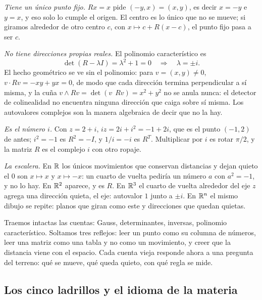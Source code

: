 \emph{Tiene un único punto fijo.} \(Rx=x\) pide \((-y,x)=(x,y)\), es decir \(x=-y\) e
\(y=x\), y eso solo lo cumple el origen. El centro es lo único que no se mueve; si giramos
alrededor de otro centro \(c\), con \(x\mapsto c+R(x-c)\), el punto fijo pasa a ser \(c\).

\emph{No tiene direcciones propias reales.} El polinomio característico es
\[
  \det(R-\lambda I)=\lambda^2+1=0\quad\Longrightarrow\quad\lambda=\pm i .
\]
El hecho geométrico se ve sin el polinomio: para \(v=(x,y)\neq0\), \(v\cdot Rv=-xy+yx=0\),
de modo que cada dirección termina perpendicular a sí misma, y la cuña
\(v\wedge Rv=\det(v\ \ Rv)=x^2+y^2\) no se anula nunca: el detector de colinealidad no
encuentra ninguna dirección que caiga sobre sí misma. Los autovalores complejos son la
manera algebraica de decir que no la hay.

\emph{Es el número \(i\).} Con \(z=2+i\), \(iz=2i+i^2=-1+2i\), que es el punto \((-1,2)\) de
antes; \(i^2=-1\) es \(R^2=-I\), y \(1/i=-i\) es \(R^T\). Multiplicar por \(i\) es rotar
\(\pi/2\), y la matriz \(R\) es el complejo \(i\) con otro ropaje.

\emph{La escalera.} En \(\mathbb{R}\) los únicos movimientos que conservan distancias y dejan quieto
el \(0\) son \(x\mapsto x\) y \(x\mapsto-x\): un cuarto de vuelta pediría un número \(a\)
con \(a^2=-1\), y no lo hay. En \(\mathbb{R}^2\) aparece, y es \(R\). En \(\mathbb{R}^3\) el cuarto de vuelta
alrededor del eje \(z\) agrega una dirección quieta, el eje: autovalor \(1\) junto a
\(\pm i\). En \(\mathbb{R}^n\) el mismo dibujo se repite: planos que giran como este y direcciones
que quedan quietas.

\begin{idea}
Traemos intactas las cuentas: Gauss, determinantes, inversas, polinomio característico.
Soltamos tres reflejos: leer un punto como su columna de números, leer una matriz como una
tabla y no como un movimiento, y creer que la distancia viene con el espacio. Cada cuenta
vieja responde ahora a una pregunta del terreno: qué se mueve, qué queda quieto, con qué
regla se mide.
\end{idea}

{\small\vspace{1mm}\par}

\subsection{Los cinco ladrillos y el idioma de la materia}\label{sec:desaprender}

